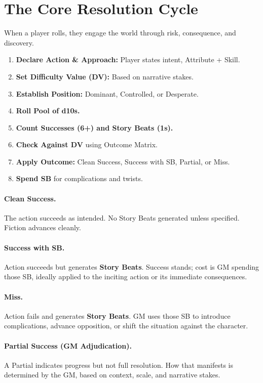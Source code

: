 \section{The Core Resolution Cycle}
\label{sec:core-resolution-cycle}

When a player rolls, they engage the world through risk, consequence, and discovery.

\begin{enumerate}
\item \textbf{Declare Action \& Approach:} Player states intent, Attribute + Skill.
\item \textbf{Set Difficulty Value (DV):} Based on narrative stakes.
\item \textbf{Establish Position:} Dominant, Controlled, or Desperate.
\item \textbf{Roll Pool of d10s.}
\item \textbf{Count Successes (6+) and Story Beats (1s).}
\item \textbf{Check Against DV} using Outcome Matrix.
\item \textbf{Apply Outcome:} Clean Success, Success with SB, Partial, or Miss.
\item \textbf{Spend SB} for complications and twists.
\end{enumerate}

\paragraph{Clean Success.}
The action succeeds as intended. No Story Beats generated unless specified. Fiction advances cleanly.

\paragraph{Success with SB.}
Action succeeds but generates \textbf{Story Beats}. Success stands; cost is GM spending those SB, ideally applied to the inciting action or its immediate consequences.

\paragraph{Miss.}
Action fails and generates \textbf{Story Beats}. GM uses those SB to introduce complications, advance opposition, or shift the situation against the character.

\paragraph{Partial Success (GM Adjudication).}
A Partial indicates progress but not full resolution. How that manifests is determined by the GM, based on context, scale, and narrative stakes.

